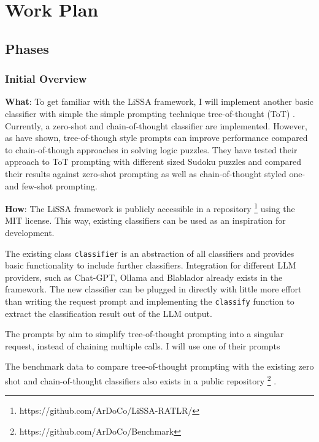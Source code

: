 \chapter{Work Plan}

\section{Phases}
\subsection{Initial Overview}
\label{phase_initial_overview}

\textbf{What}: To get familiar with the LiSSA framework, I will implement another basic classifier with simple the simple prompting technique tree-of-thought (ToT) \cite{long2023LargeLanguage}. 
Currently, a zero-shot and chain-of-thought classifier are implemented. However, as \citeauthor{long2023LargeLanguage} have shown, tree-of-though style prompts can improve performance compared to chain-of-though approaches in solving logic puzzles. They have tested their approach to ToT prompting with different sized Sudoku puzzles and compared their results against zero-shot prompting as well as chain-of-thought styled one- and few-shot prompting. 


\textbf{How}: The LiSSA framework is publicly accessible in a repository \footnote{https://github.com/ArDoCo/LiSSA-RATLR/} using the MIT license. This way, existing classifiers can be used as an inspiration for development. 

The existing class \verb|classifier| is an abstraction of all classifiers and provides basic functionality to include further classifiers. Integration for different LLM providers, such as Chat-GPT, Ollama and Blablador already exists in the framework. The new classifier can be plugged in directly with little more effort than writing the request prompt and implementing the \verb|classify| function to extract the classification result out of the LLM output.

The prompts by  aim to simplify tree-of-thought prompting into a singular request, instead of chaining multiple calls. I will use one of their prompts

The benchmark data to compare tree-of-thought prompting with the existing zero shot and chain-of-thought classifiers also exists in a public repository \footnote{https://github.com/ArDoCo/Benchmark} \cite{fuchss2022ArDoCoBenchmark}. 


